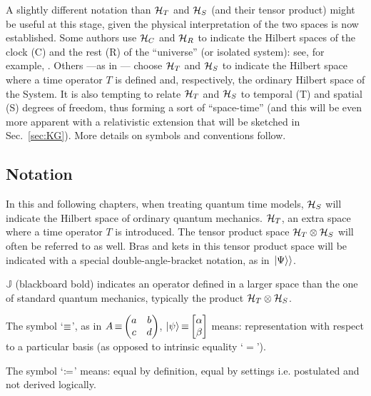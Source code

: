 A slightly different notation than $\mathcal{H}_T$ and $\mathcal{H}_S$ (and their tensor product)
might be useful at this stage, given
the physical interpretation of the two spaces is now established.
Some authors
use $\mathcal{H}_C$ and $\mathcal{H}_R$
to indicate the Hilbert spaces of the clock (C) and the rest (R) of the ``universe''
(or isolated system):
see, for example, \cite{Marletto:Evolution}.
Others ---as in \cite{Lloyd:Time}--- 
choose $\mathcal{H}_T$ and $\mathcal{H}_S$ to indicate the Hilbert space where
a time operator $T$ is defined and, respectively,
the ordinary Hilbert space of the System.
It is also tempting to relate $\mathcal{H}_T$ and $\mathcal{H}_S$
to temporal (T) and spatial (S)
degrees of freedom, thus forming a sort of
``space-time'' (and this will be even more apparent
with a relativistic extension that will be sketched in Sec.~\ref{sec:KG}).
More details on symbols and conventions follow.

\subsection*{Notation}

In this and following chapters, when treating quantum time models,
$\mathcal{H}_S$ will indicate the Hilbert space of ordinary quantum mechanics.
$\mathcal{H}_T$, an extra space where a time operator ${T}$ is introduced. The tensor
product space $\mathcal{H}_T \otimes \mathcal{H}_S$
will often be referred to as well.
Bras and kets in this tensor product space will be indicated with a special double-angle-bracket
notation, as in $\left.\left| \Psi \right\rangle\right\rangle$.

${\mathbb{J}}$ (blackboard bold) indicates an  operator defined in
a larger space than the one of standard quantum mechanics,
typically the product $\mathcal{H}_T \otimes \mathcal{H}_S$.

The symbol `$\operatorname*{\equiv}$', as in $\op{A} \repr \mqty(a&b\\c&d)$, $\ket{\psi} \repr \mqty[\alpha \\ \beta]$
means: representation with respect to a particular basis (as opposed to intrinsic equality `$=$').

The symbol `$\coloneqq$'
means: equal by definition, equal by settings i.e. postulated and not derived logically.
